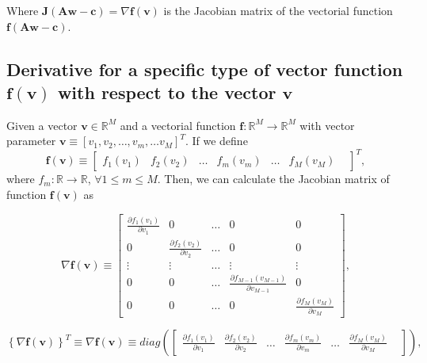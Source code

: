 Where $\mathbf{J}\left(\mathbf{A}\mathbf{w}-\mathbf{c}\right)=\nabla \mathbf{f}(\mathbf{v})$ is the Jacobian matrix of the vectorial function $\mathbf{f}\left(\mathbf{A}\mathbf{w}-\mathbf{c}\right)$.

\subsection{Derivative for a specific type of vector function $\mathbf{f}(\mathbf{v})$ with respect to the vector $\mathbf{v}$}

Given 
a vector $\mathbf{v} \in \mathbb{R}^{M}$ and 
a vectorial function $\mathbf{f}:\mathbb{R}^{M} \to \mathbb{R}^{M}$ with vector parameter 
$\mathbf{v}\equiv \left[v_{1}, v_{2}, \dots,v_{m},\dots v_{M}\right]^{T}$.
If we define 
\begin{equation}
\mathbf{f}(\mathbf{v}) 
\equiv
\begin{bmatrix}
f_{1}(v_{1}) &
f_{2}(v_{2}) &
\dots&
f_{m}(v_{m}) &
\dots&
f_{M}(v_{M}) &
\end{bmatrix}^{T},
\end{equation}
where $f_{m}:\mathbb{R} \to \mathbb{R}$, $\forall 1 \leq m\leq M$.
Then, we can calculate the Jacobian matrix of function $\mathbf{f}(\mathbf{v})$ as

\begin{equation}
\nabla\mathbf{f}(\mathbf{v}) 
\equiv
\begin{bmatrix}
\frac{\partial f_{1}(v_{1})}{\partial v_{1}} & 0  & \dots & 0      & 0\\
0  & \frac{\partial f_{2}(v_{2})}{\partial v_{2}} & \dots & 0      & 0\\
\vdots                  & \vdots                  & \dots & \vdots & \vdots\\
0                       & 0                       & \dots & \frac{\partial f_{M-1}(v_{M-1})}{\partial v_{M-1}} & 0\\
0                       & 0                       & \dots & 0      & \frac{\partial f_{M}(v_{M})}{\partial v_{M}}
\end{bmatrix},
\end{equation}

\begin{equation}
\left\{\nabla \mathbf{f}(\mathbf{v}) \right\}^{T}
\equiv
\nabla \mathbf{f}(\mathbf{v}) 
\equiv
diag
\left(
\begin{bmatrix}
\frac{\partial f_{1}(v_{1})}{\partial v_{1}} &
\frac{\partial f_{2}(v_{2})}{\partial v_{2}} &
\dots&
\frac{\partial f_{m}(v_{m})}{\partial v_{m}} &
\dots&
\frac{\partial f_{M}(v_{M})}{\partial v_{M}} &
\end{bmatrix}
\right),
\end{equation}

